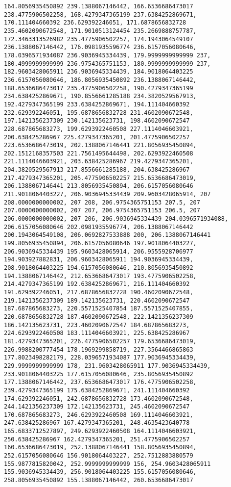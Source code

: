 \documentclass{article}
\begin{document}
\begin{Verbatim}[commandchars=\\\{\}]
164.8056935450892 239.1388067146442, 166.6536686473017 238.4775906502258, 168.4279347365199 237.6384252869671, 170.111404660392 236.629392246051, 171.6878656832728 235.4602090672548, 171.9010513124454 235.2669888757787, 172.3463313526982 235.4775906502257, 174.1943064549107 236.1388067146442, 176.0981935596774 236.6157056080646, 178.0396571934087 236.9036945334439, 179.9999999999999 237, 180.4999999999999 236.9754365751153, 180.9999999999999 237, 182.9603428065911 236.9036945334439, 184.9018064403225 236.6157056080646, 186.8056935450892 236.1388067146442, 188.6536686473017 235.4775906502258, 190.4279347365199 234.6384252869671, 190.8556661285188 234.3820529567913, 192.4279347365199 233.6384252869671, 194.111404660392 232.629392246051, 195.6878656832728 231.4602090672548, 197.1421356237309 230.142135623731, 198.4602090672547 228.687865683273, 199.6293922460508 227.1114046603921, 200.638425286967 225.4279347365201, 201.4775906502257 223.6536686473019, 202.1388067146441 221.8056935450894, 202.1512168357503 221.7561495644498, 202.6293922460508 221.1114046603921, 203.638425286967 219.4279347365201, 204.3820529567913 217.8556661285188, 204.638425286967 217.4279347365201, 205.4775906502257 215.6536686473019, 206.1388067146441 213.8056935450894, 206.6157056080646 211.9018064403227, 206.9036945334439 209.9603428065914, 207 208.0000000000002, 207 208, 206.9754365751153 207.5, 207 207.0000000000002, 207 207, 206.9754365751153 206.5, 207 206.0000000000002, 207 206, 206.9036945334439 204.0396571934088, 206.6157056080646 202.0981935596774, 206.1388067146442 200.1943064549108, 206.0692827533888 200, 206.1388067146441 199.8056935450894, 206.6157056080646 197.9018064403227, 206.9036945334439 195.9603428065914, 206.9555928706977 194.903927882831, 206.9603428065911 194.9036945334439, 208.9018064403225 194.6157056080646, 210.8056935450892 194.1388067146442, 212.6536686473017 193.4775906502258, 214.4279347365199 192.6384252869671, 216.111404660392 191.629392246051, 217.6878656832728 190.4602090672548, 219.1421356237309 189.142135623731, 220.4602090672547 187.687865683273, 220.5571525407854 187.5571525407855, 220.6878656832728 187.4602090672548, 222.1421356237309 186.142135623731, 223.4602090672547 184.687865683273, 224.6293922460508 183.1114046603921, 225.638425286967 181.4279347365201, 226.4775906502257 179.6536686473019, 226.9988200777454 178.1969299858719, 227.3564466865863 177.8023498282179, 228.0396571934087 177.9036945334439, 229.9999999999999 178, 231.9603428065911 177.9036945334439, 233.9018064403225 177.6157056080646, 235.8056935450892 177.1388067146442, 237.6536686473017 176.4775906502258, 239.4279347365199 175.6384252869671, 241.111404660392 174.629392246051, 242.6878656832728 173.4602090672548, 244.1421356237309 172.142135623731, 245.4602090672547 170.687865683273, 246.6293922460508 169.1114046603921, 247.638425286967 167.4279347365201, 248.4635423640778 165.6833712527897, 249.6293922460508 164.1114046603921, 250.638425286967 162.4279347365201, 251.4775906502257 160.6536686473019, 252.1388067146441 158.8056935450894, 252.6157056080646 156.9018064403227, 252.7512883880579 155.9877815820042, 252.9999999999999 156, 254.9603428065911 155.9036945334439, 256.9018064403225 155.6157056080646, 258.8056935450892 155.1388067146442, 260.6536686473017 
\end{Verbatim}
\end{document}
